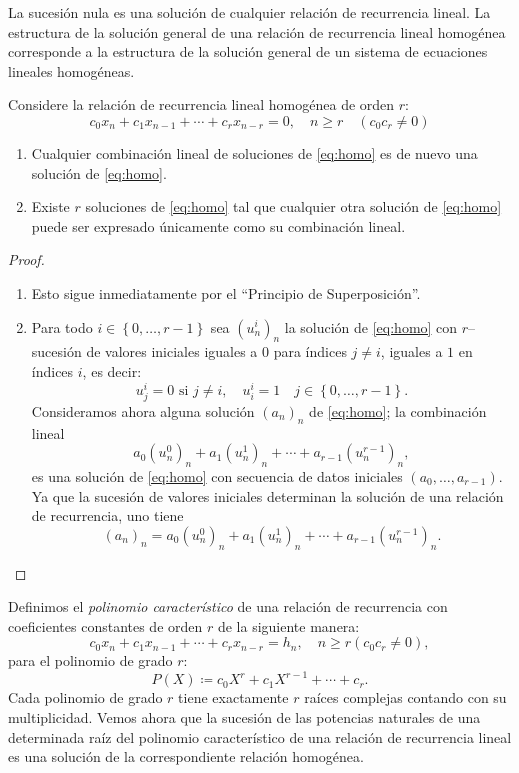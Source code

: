 La sucesión nula es una solución de cualquier relación de recurrencia lineal. La estructura de la solución general de una relación de recurrencia lineal homogénea corresponde a la estructura de la solución general de un sistema de ecuaciones lineales homogéneas.
\begin{proposition}
	Considere la relación de recurrencia lineal homogénea de orden $r$:
	\begin{equation}\label{eq:homo}
	c_{0}x_{n}+c_{1}x_{n-1}+\cdots+c_{r}x_{n-r}=0,\quad n\geq r\quad\left(c_{0}c_{r}\neq0\right)
	\end{equation}
	\begin{enumerate}
		\item Cualquier combinación lineal de soluciones de \eqref{eq:homo} es de nuevo una solución de \eqref{eq:homo}.
		\item Existe $r$ soluciones de \eqref{eq:homo} tal que cualquier otra solución de \eqref{eq:homo} puede ser expresado únicamente como su combinación lineal.
	\end{enumerate}
\end{proposition}

\begin{proof}\leavevmode
	\begin{enumerate}
		\item Esto sigue inmediatamente por el ``Principio de Superposición''.
		\item Para todo $i\in\left\{0,\ldots,r-1 \right\}$ sea $\left(u^{i}_{n}\right)_{n}$ la solución de \eqref{eq:homo} con $r$--sucesión de valores iniciales iguales a $0$ para índices $j\neq i$, iguales a $1$ en índices $i$, es decir: \[ u^{i}_{j}=0\text{ si }j\neq i,\quad u^{i}_{i}=1\quad j\in\left\{0,\ldots,r-1 \right\}. \]
		Consideramos ahora alguna solución $(a_{n})_{n}$ de \eqref{eq:homo}; la combinación lineal \[ a_{0}{\left(u^{0}_{n}\right)}_{n}+a_{1}{\left(u^{1}_{n}\right)}_{n}+\cdots+a_{r-1}(u^{r-1}_{n})_{n}, \]	es una solución de \eqref{eq:homo} con secuencia de datos iniciales $\left(a_{0},\ldots,a_{r-1}\right)$. Ya que la sucesión de valores iniciales determinan la solución de una relación de recurrencia, uno tiene \[ {\left(a_{n}\right)}_{n}=a_{0}\left(u^{0}_{n}\right)_{n}+a_{1}\left(u^{1}_{n}\right)_{n}+\cdots+a_{r-1}\left(u^{r-1}_{n}\right)_{n}. \]
	\end{enumerate}
\end{proof}

\begin{definition}
	Definimos el \emph{polinomio característico} de una relación de recurrencia con coeficientes constantes de orden $r$ de la siguiente manera: \[ c_{0}x_{n}+c_{1}x_{n-1}+\cdots+c_{r}x_{n-r}=h_{n},\quad n\geq r\left(c_{0}c_{r}\neq0\right), \] para el polinomio de grado $r$: \[ P(X)\coloneqq c_{0}X^{r}+c_{1}X^{r-1}+\cdots+c_{r}. \] Cada polinomio de grado $r$ tiene exactamente $r$ raíces complejas contando con su multiplicidad. Vemos ahora que la sucesión de las potencias naturales de una determinada raíz del polinomio característico de una relación de recurrencia lineal es una solución de la correspondiente relación homogénea.
\end{definition}

